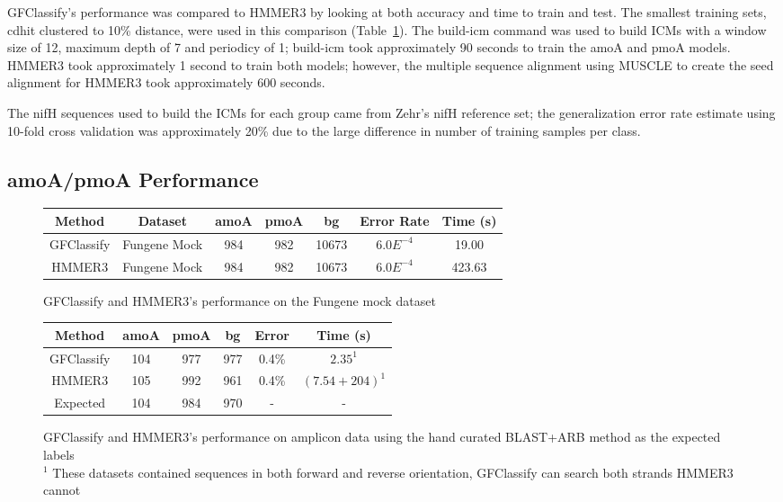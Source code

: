 \documentclass{article}
\begin{document}
GFClassify's performance was compared to HMMER3 by looking at both accuracy and time to train and test.  The smallest training sets, cdhit clustered to 10\% distance, were used in this comparison (Table~\ref{tab:hmmer3_comp_mock}).  The build-icm command was used to build ICMs with a window size of 12, maximum depth of 7 and periodicy of 1; build-icm took approximately 90 seconds to train the amoA and pmoA models.  HMMER3 took approximately 1 second to train both models; however, the multiple sequence alignment using MUSCLE to create the seed alignment for HMMER3 took approximately 600 seconds.

The nifH sequences used to build the ICMs for each group came from Zehr's nifH reference set; the generalization error rate estimate using 10-fold cross validation was approximately 20\% due to the large difference in number of training samples per class.

\subsection{amoA/pmoA Performance}
\begin{figure}
  \center
  \begin{tabular}{|c|cccccc|}
    \hline
    Method & Dataset & amoA & pmoA & bg & Error Rate & Time (s)\\
    \hline
    GFClassify & Fungene Mock & 984 & 982 & 10673 & $6.0E^{-4}$ & 19.00 \\
    \hline
    HMMER3 & Fungene Mock & 984 & 982 & 10673 & $6.0E^{-4}$ & 423.63 \\
    \hline
  \end{tabular}
  \caption{GFClassify and HMMER3's performance on the Fungene mock dataset}
  \label{tab:hmmer3_comp_mock}
\end{figure}
\begin{figure}
  \center
  \begin{tabular}{|c|ccccc|}
    \hline
    Method & amoA & pmoA & bg & Error & Time (s)\\
    \hline
    GFClassify & 104 & 977  & 977 & 0.4\% & $2.35^1$ \\
    \hline
    HMMER3  & 105  & 992 & 961 & 0.4\% & $(7.54 + 204)^1$\\
    \hline
    Expected & 104  & 984   & 970   & - & - \\
    \hline
  \end{tabular}
  \caption{GFClassify and HMMER3's performance on amplicon data using the hand curated BLAST+ARB method as the expected labels\\{\tiny $^1$ These datasets contained sequences in both forward and reverse orientation, GFClassify can search both strands HMMER3 cannot}}
  \label{tab:hmmer3_comp_amplicon}
\end{figure}
\end{document}

